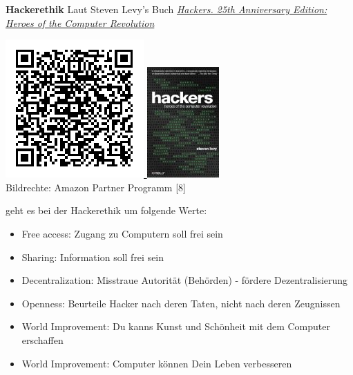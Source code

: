 \textbf{Hackerethik} Laut Steven Levy's Buch \href{http://www.amazon.de/gp/product/1449388396/ref=as_li_ss_tl?ie=UTF8&camp=1638&creative=19454&creativeASIN=1449388396&linkCode=as2&tag=spielendprogr-21}{\textit{Hackers. 25th Anniversary Edition: Heroes of the Computer Revolution}}\\ 
\begin{center}
\href{http://www.amazon.de/gp/product/1449388396/ref=as_li_ss_tl?ie=UTF8&camp=1638&creative=19454&creativeASIN=1449388396&linkCode=as2&tag=spielendprogr-21}{
\includegraphics[width=0.4\linewidth]{editorial/editorial-hackersqrcode.png} 
\includegraphics[width=0.4\linewidth]{editorial/editorial-hackers.jpg}}\\
\footnotesize{Bildrechte: Amazon Partner Programm [8]}
\end{center}
geht es bei der Hackerethik um folgende Werte:
\begin{itemize}
\item Free access: Zugang zu Computern soll frei sein
\item Sharing: Information soll frei sein
\item Decentralization: Misstraue Autorität (Behörden) - fördere Dezentralisierung
\item Openness: Beurteile Hacker nach deren Taten, nicht nach deren Zeugnissen
\item World Improvement: Du kanns Kunst und Schönheit mit dem Computer erschaffen
\item World Improvement: Computer können Dein Leben verbesseren
\end{itemize}


